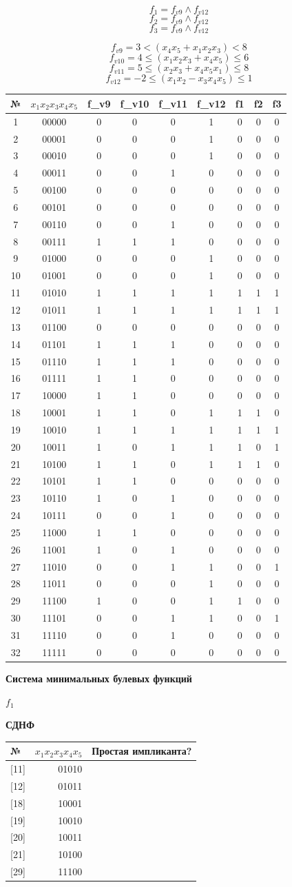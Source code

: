 \[f_1 = f_{v9} \land f_{v12}\] \[f_2 = f_{v9} \land f_{v12}\]
\[f_3 = f_{v9} \land f_{v12}\]

\[f_{v9} = 3<( x_4x_5+x_1x_2x_3)<8\]
\[f_{v10} = 4\le ( x_1x_2x_3+x_4x_5)\le6\]
\[f_{v11} = 5\le(x_2x_3+x_4x_5x_1)\le8\]
\[f_{v12} = -2\le(x_1x_2-x_3x_4x_5)\le1\]

\begin{longtable}[]{@{}ccccccccc@{}}
\toprule
№ & \(x_1x_2x_3x_4x_5\) & f\_v9 & f\_v10 & f\_v11 & f\_v12 & f1 & f2 &
f3\tabularnewline
\midrule
\endhead
1 & 00000 & 0 & 0 & 0 & 1 & 0 & 0 & 0\tabularnewline
2 & 00001 & 0 & 0 & 0 & 1 & 0 & 0 & 0\tabularnewline
3 & 00010 & 0 & 0 & 0 & 1 & 0 & 0 & 0\tabularnewline
4 & 00011 & 0 & 0 & 1 & 0 & 0 & 0 & 0\tabularnewline
5 & 00100 & 0 & 0 & 0 & 0 & 0 & 0 & 0\tabularnewline
6 & 00101 & 0 & 0 & 0 & 0 & 0 & 0 & 0\tabularnewline
7 & 00110 & 0 & 0 & 1 & 0 & 0 & 0 & 0\tabularnewline
8 & 00111 & 1 & 1 & 1 & 0 & 0 & 0 & 0\tabularnewline
9 & 01000 & 0 & 0 & 0 & 1 & 0 & 0 & 0\tabularnewline
10 & 01001 & 0 & 0 & 0 & 1 & 0 & 0 & 0\tabularnewline
11 & 01010 & 1 & 1 & 1 & 1 & 1 & 1 & 1\tabularnewline
12 & 01011 & 1 & 1 & 1 & 1 & 1 & 1 & 1\tabularnewline
13 & 01100 & 0 & 0 & 0 & 0 & 0 & 0 & 0\tabularnewline
14 & 01101 & 1 & 1 & 1 & 0 & 0 & 0 & 0\tabularnewline
15 & 01110 & 1 & 1 & 1 & 0 & 0 & 0 & 0\tabularnewline
16 & 01111 & 1 & 1 & 0 & 0 & 0 & 0 & 0\tabularnewline
17 & 10000 & 1 & 1 & 0 & 0 & 0 & 0 & 0\tabularnewline
18 & 10001 & 1 & 1 & 0 & 1 & 1 & 1 & 0\tabularnewline
19 & 10010 & 1 & 1 & 1 & 1 & 1 & 1 & 1\tabularnewline
20 & 10011 & 1 & 0 & 1 & 1 & 1 & 0 & 1\tabularnewline
21 & 10100 & 1 & 1 & 0 & 1 & 1 & 1 & 0\tabularnewline
22 & 10101 & 1 & 1 & 0 & 0 & 0 & 0 & 0\tabularnewline
23 & 10110 & 1 & 0 & 1 & 0 & 0 & 0 & 0\tabularnewline
24 & 10111 & 0 & 0 & 1 & 0 & 0 & 0 & 0\tabularnewline
25 & 11000 & 1 & 1 & 0 & 0 & 0 & 0 & 0\tabularnewline
26 & 11001 & 1 & 0 & 1 & 0 & 0 & 0 & 0\tabularnewline
27 & 11010 & 0 & 0 & 1 & 1 & 0 & 0 & 1\tabularnewline
28 & 11011 & 0 & 0 & 0 & 1 & 0 & 0 & 0\tabularnewline
29 & 11100 & 1 & 0 & 0 & 1 & 1 & 0 & 0\tabularnewline
30 & 11101 & 0 & 0 & 1 & 1 & 0 & 0 & 1\tabularnewline
31 & 11110 & 0 & 0 & 1 & 0 & 0 & 0 & 0\tabularnewline
32 & 11111 & 0 & 0 & 0 & 0 & 0 & 0 & 0\tabularnewline
\bottomrule
\end{longtable}

\textbf{Система минимальных булевых функций}

\(f_1\)

\textbf{СДНФ}

\begin{longtable}[]{@{}lrl@{}}
\toprule
№ & \(x_1x_2x_3x_4x_5\) & Простая импликанта?\tabularnewline
\midrule
\endhead
{[}11{]} & 01010 &\tabularnewline
{[}12{]} & 01011 &\tabularnewline
{[}18{]} & 10001 &\tabularnewline
{[}19{]} & 10010 &\tabularnewline
{[}20{]} & 10011 &\tabularnewline
{[}21{]} & 10100 &\tabularnewline
{[}29{]} & 11100 &\tabularnewline
\bottomrule
\end{longtable}

